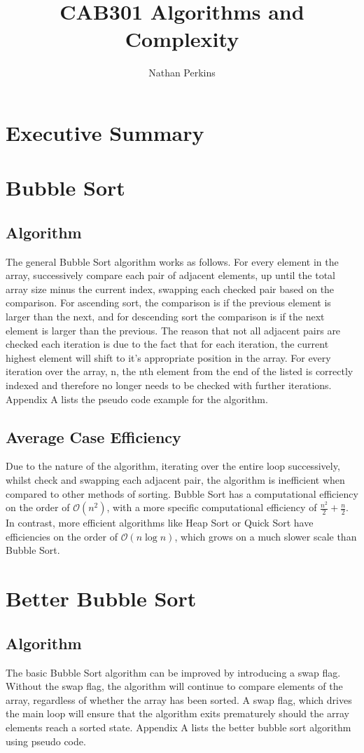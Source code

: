 \documentclass[]{article}
\title{CAB301 Algorithms and Complexity}
\author{Nathan Perkins}
\begin{document}
\maketitle
\newpage
\tableofcontents
\newpage
\section{Executive Summary}
\section{Bubble Sort}
\subsection{Algorithm}
The general Bubble Sort algorithm works as follows. For every element in the array, successively compare each pair of adjacent elements, up until the total array size minus the current index, swapping each checked pair based on the comparison. For ascending sort, the comparison is if the previous element is larger than the next, and for descending sort the comparison is if the next element is larger than the previous. The reason that not all adjacent pairs are checked each iteration is due to the fact that for each iteration, the current highest element will shift to it's appropriate position in the array. For every iteration over the array, n, the nth element from the end of the listed is correctly indexed and therefore no longer needs to be checked with further iterations. Appendix A lists the pseudo code example for the algorithm.
\subsection{Average Case Efficiency}
Due to the nature of the algorithm, iterating over the entire loop successively, whilst check and swapping each adjacent pair, the algorithm is inefficient when compared to other methods of sorting. Bubble Sort has a computational efficiency on the order of $\mathcal{O}(n^2)$, with a more specific computational efficiency of $\frac{n^2}{2} + \frac{n}{2}$.
\cite{BubbleSort}
In contrast, more efficient algorithms like Heap Sort or Quick Sort have efficiencies on the order of $\mathcal{O}(n\log{}n)$,
which grows on a much slower scale than Bubble Sort.
\cite{HeapSort}
\section{Better Bubble Sort}
\subsection{Algorithm}
The basic Bubble Sort algorithm can be improved by introducing a swap flag. Without the swap flag, the algorithm will continue to compare elements of the array, regardless of whether the array has been sorted. A swap flag, which drives the main loop will ensure that the algorithm exits prematurely should the array elements reach a sorted state. Appendix A lists the better bubble sort algorithm using pseudo code.
\end{document}
